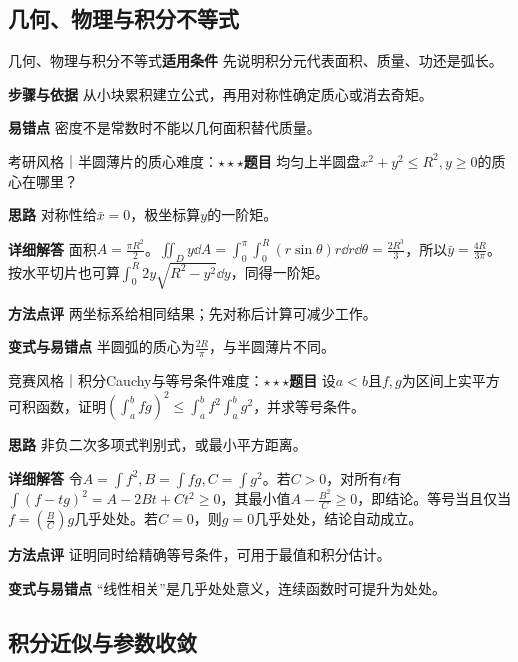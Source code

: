\subsection{几何、物理与积分不等式}\label{deep:multiple_source_deep:applications}

\begin{method}{几何、物理与积分不等式}\textbf{适用条件} 先说明积分元代表面积、质量、功还是弧长。\par\textbf{步骤与依据} 从小块累积建立公式，再用对称性确定质心或消去奇矩。\par\textbf{易错点} 密度不是常数时不能以几何面积替代质量。\end{method}

\begin{example}{考研风格｜半圆薄片的质心}{难度：$\star\star\star$}\label{deep:ex:multiple_source_deep:centroid}\textbf{题目} 均匀上半圆盘$x^2+y^2\le R^2,y\ge0$的质心在哪里？\par\textbf{思路} 对称性给$\bar x=0$，极坐标算$y$的一阶矩。\par\textbf{详细解答} 面积$A=\frac{\pi R^2}{2}$。$\iint_Dy\dd A=\int_0^\pi\int_0^R(r\sin\theta)r\dd r\dd\theta=\frac{2R^3}{3}$，所以$\bar y=\frac{4R}{3\pi}$。按水平切片也可算$\int_0^R2y\sqrt{R^2-y^2}\dd y$，同得一阶矩。\par\textbf{方法点评} 两坐标系给相同结果；先对称后计算可减少工作。\par\textbf{变式与易错点} 半圆弧的质心为$\frac{2R}{\pi}$，与半圆薄片不同。\end{example}

\begin{example}{竞赛风格｜积分Cauchy与等号条件}{难度：$\star\star\star$}\label{deep:ex:multiple_source_deep:holder}\textbf{题目} 设$a<b$且$f,g$为区间上实平方可积函数，证明$(\int_a^bf g)^2\le\int_a^bf^2\int_a^bg^2$，并求等号条件。\par\textbf{思路} 非负二次多项式判别式，或最小平方距离。\par\textbf{详细解答} 令$A=\int f^2,B=\int fg,C=\int g^2$。若$C>0$，对所有$t$有$\int(f-tg)^2=A-2Bt+Ct^2\ge0$，其最小值$A-\frac{B^2}{C}\ge0$，即结论。等号当且仅当$f=(\frac{B}{C})g$几乎处处。若$C=0$，则$g=0$几乎处处，结论自动成立。\par\textbf{方法点评} 证明同时给精确等号条件，可用于最值和积分估计。\par\textbf{变式与易错点} “线性相关”是几乎处处意义，连续函数时可提升为处处。\end{example}

\subsection{积分近似与参数收敛}\label{deep:multiple_source_deep:numerics}

